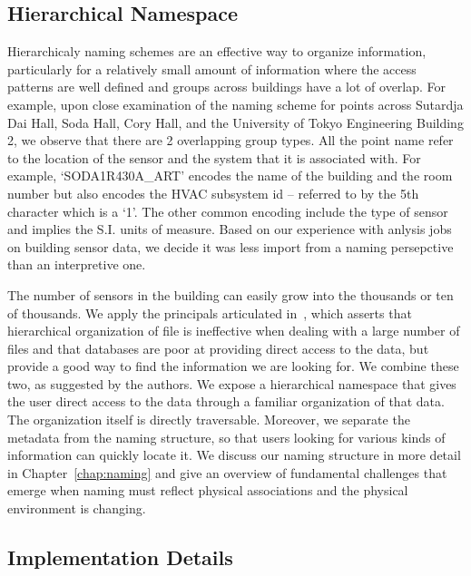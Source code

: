
\subsection{Hierarchical Namespace}

Hierarchicaly naming schemes are an effective way to organize information, particularly for a relatively small amount of information
where the access patterns are well defined and groups across buildings have a lot of overlap.  For example, upon close examination of
the naming scheme for points across Sutardja Dai Hall, Soda Hall, Cory Hall, and the University of Tokyo Engineering Building 2, we 
observe that there are 2 overlapping group types.  All the point name refer to the location of the sensor and the system that it is 
associated with.  For example, `SODA1R430A\_ART' encodes the name of the building and the room number but also encodes the HVAC subsystem id --
referred to by the 5th character which is a `1'.  The other common encoding include the type of sensor and implies the S.I. units of measure.
Based on our experience with anlysis jobs on building sensor data, we decide it was less import from a naming persepctive than 
an interpretive one.

The number of sensors in the building can easily grow into the thousands or ten of thousands.  We apply the principals articulated 
in~\cite{hierarchy_is_dead}, which asserts that hierarchical organization of file is ineffective when dealing with a large number of files
and that databases are poor at providing direct access to the data, but provide a good way to find the information we are looking for.
We combine these two, as suggested by the authors.  We expose a hierarchical namespace that gives the user direct access to the data
through a familiar organization of that data.  The organization itself is directly traversable.  Moreover, we separate the metadata from
the naming structure, so that users looking for various kinds of information can quickly locate it.
We discuss our naming structure in more detail in Chapter~\ref{chap:naming} and give an overview of fundamental challenges that emerge when
naming must reflect physical associations and the physical environment is changing.

\subsection{Implementation Details}

